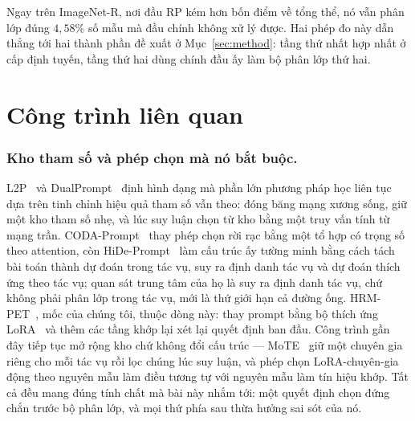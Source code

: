 \documentclass[runningheads]{llncs}
\begin{document}
Ngay trên ImageNet-R, nơi đầu RP kém hơn bốn điểm về tổng thể, nó vẫn phân lớp
đúng $4{,}58\%$ số mẫu mà đầu chính không xử lý được. Hai phép đo này dẫn thẳng
tới hai thành phần đề xuất ở Mục~\ref{sec:method}: tầng thứ nhất hợp nhất ở cấp
định tuyến, tầng thứ hai dùng chính đầu ấy làm bộ phân lớp thứ hai.

\section{Công trình liên quan}
\label{sec:related}

\subsubsection{Kho tham số và phép chọn mà nó bắt buộc.}
L2P~\cite{ref_l2p} và DualPrompt~\cite{ref_dualprompt} định hình dạng mà phần
lớn phương pháp học liên tục dựa trên tinh chỉnh hiệu quả tham số vẫn theo: đóng
băng mạng xương sống, giữ một kho tham số nhẹ, và lúc suy luận chọn từ kho bằng
một truy vấn tính từ mạng trần. CODA-Prompt~\cite{ref_coda} thay phép chọn rời
rạc bằng một tổ hợp có trọng số theo attention, còn HiDe-Prompt~\cite{ref_hide}
làm cấu trúc ấy tường minh bằng cách tách bài toán thành dự đoán trong tác vụ,
suy ra định danh tác vụ và dự đoán thích ứng theo tác vụ; quan sát trung tâm của
họ là suy ra định danh tác vụ, chứ không phải phân lớp trong tác vụ, mới là thứ
giới hạn cả đường ống. HRM-PET~\cite{ref_hrmpet}, mốc của chúng tôi, thuộc dòng
này: thay prompt bằng bộ thích ứng LoRA~\cite{ref_lora} và thêm các tầng khớp
lại xét lại quyết định ban đầu. Công trình gần đây tiếp tục mở rộng kho chứ
không đổi cấu trúc --- MoTE~\cite{ref_mote} giữ một chuyên gia riêng cho mỗi tác
vụ rồi lọc chúng lúc suy luận, và phép chọn LoRA-chuyên-gia động theo nguyên mẫu
\cite{ref_dlepem} làm điều tương tự với nguyên mẫu làm tín hiệu khớp. Tất cả đều
mang đúng tính chất mà bài này nhắm tới: một quyết định chọn đứng chắn trước bộ
phân lớp, và mọi thứ phía sau thừa hưởng sai sót của nó.
\end{document}
